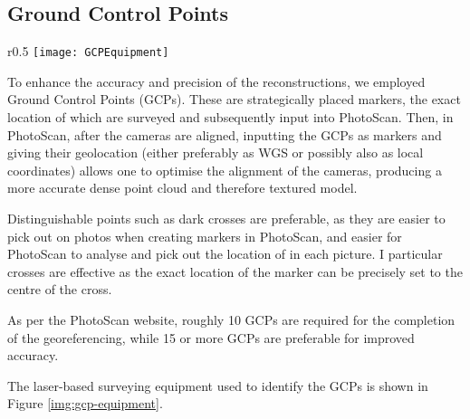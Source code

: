 \subsection{Ground Control Points}

\begin{wrapfigure}{r}{0.5\textwidth}
    \centering
    \texttt{[image: GCPEquipment]}
    \caption{The equipment used to survey in Ground Control Points.}
    \label{img:gcp-equipment}
\end{wrapfigure}

To enhance the accuracy and precision of the reconstructions, we employed Ground
Control Points (GCPs). These are strategically placed markers, the exact
location of which are surveyed and subsequently input into PhotoScan. Then, in
PhotoScan, after the cameras are aligned, inputting the GCPs as markers and
giving their geolocation (either preferably as WGS or possibly also as local
coordinates) allows one to optimise the alignment of the cameras, producing a
more accurate dense point cloud and therefore textured model.

Distinguishable points such as dark crosses are preferable, as they are easier
to pick out on photos when creating markers in PhotoScan, and easier for
PhotoScan to analyse and pick out the location of in each picture. I particular
crosses are effective as the exact location of the marker can be precisely set
to the centre of the cross.

As per the PhotoScan
website,
roughly 10 GCPs are required for the completion of the georeferencing, while 15
or more GCPs are preferable for improved accuracy.

The laser-based surveying equipment used to identify the GCPs is shown in Figure
\ref{img:gcp-equipment}.
